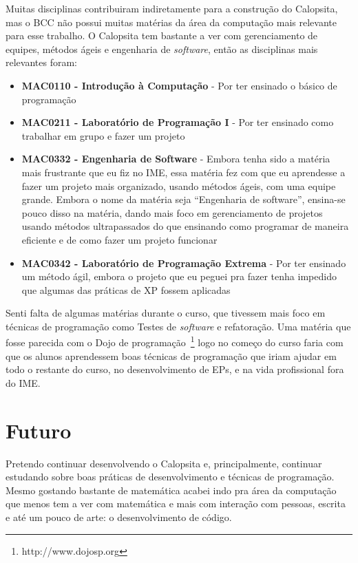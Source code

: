 \documentclass[titlepage,a4paper]{article}
\newcommand{\software}{\textit{software}}
\newcommand{\calopsita}{Calopsita}
\begin{document}
Muitas disciplinas contribuiram indiretamente para a construção do \calopsita{}, mas o BCC não possui muitas matérias da área da computação mais relevante para esse trabalho. O \calopsita{} tem bastante a ver com gerenciamento de equipes, métodos ágeis e engenharia de \software{}, então as disciplinas mais relevantes foram:

\begin{itemize}
	\item{\textbf{MAC0110 - Introdução à Computação} - Por ter ensinado o básico de programação}
	\item{\textbf{MAC0211 - Laboratório de Programação I} - Por ter ensinado como trabalhar em grupo e fazer um projeto}
	\item{\textbf{MAC0332 - Engenharia de Software} - Embora tenha sido a matéria mais frustrante que eu fiz no IME, essa matéria fez com que eu aprendesse a fazer um projeto mais organizado, usando métodos ágeis, com uma equipe grande. Embora o nome da matéria seja ``Engenharia de software'', ensina-se pouco disso na matéria, dando mais foco em gerenciamento de projetos usando métodos ultrapassados do que ensinando como programar de maneira eficiente e de como fazer um projeto funcionar}
	\item{\textbf{MAC0342 - Laboratório de Programação Extrema } - Por ter ensinado um método ágil, embora o projeto que eu peguei pra fazer tenha impedido que algumas das práticas de XP fossem aplicadas}
\end{itemize}

Senti falta de algumas matérias durante o curso, que tivessem mais foco em técnicas de programação como Testes de \software{} e refatoração. Uma matéria que fosse parecida com o Dojo de programação~\footnote{http://www.dojosp.org} logo no começo do curso faria com que os alunos aprendessem boas técnicas de programação que iriam ajudar em todo o restante do curso, no desenvolvimento de EPs, e na vida profissional fora do IME.

\section{Futuro}

Pretendo continuar desenvolvendo o \calopsita{} e, principalmente, continuar estudando sobre boas práticas de desenvolvimento e técnicas de programação. Mesmo gostando bastante de matemática acabei indo pra área da computação que menos tem a ver com matemática e mais com interação com pessoas, escrita e até um pouco de arte: o desenvolvimento de código.
\end{document}
